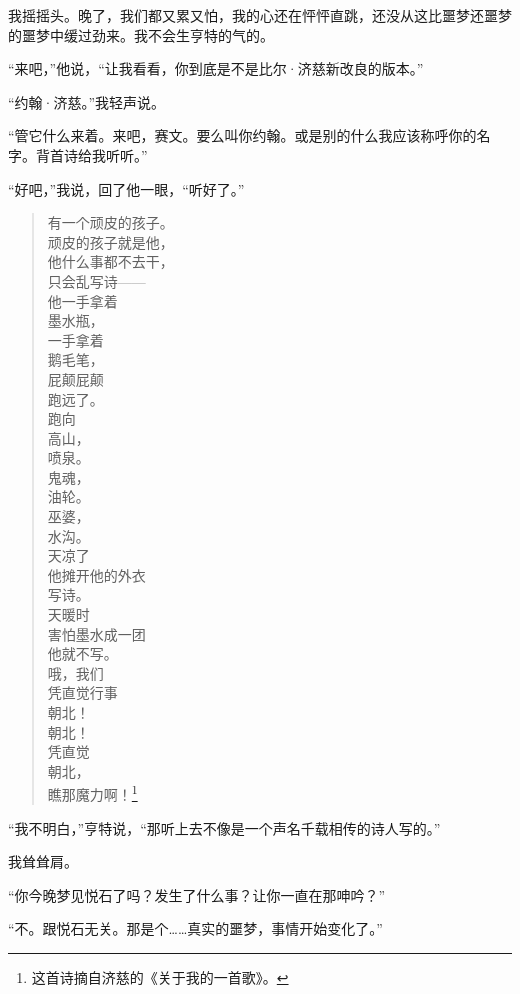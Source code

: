 \documentclass[AutoFakeBold=true]{book}
\begin{document}
我摇摇头。晚了，我们都又累又怕，我的心还在怦怦直跳，还没从这比噩梦还噩梦的噩梦中缓过劲来。我不会生亨特的气的。

``来吧，''他说，``让我看看，你到底是不是比尔·济慈新改良的版本。''

``约翰·济慈。''我轻声说。

``管它什么来着。来吧，赛文。要么叫你约翰。或是别的什么我应该称呼你的名字。背首诗给我听听。''

``好吧，''我说，回了他一眼，``听好了。''

\begin{quote}
	{\kaishu 有一个顽皮的孩子。\\
	顽皮的孩子就是他，\\
	他什么事都不去干，\\
	只会乱写诗——\\
	他一手拿着\\
	墨水瓶，\\
	一手拿着\\
	鹅毛笔，\\
	屁颠屁颠\\
	跑远了。\\
	跑向\\
	高山，\\
	喷泉。\\
	鬼魂，\\
	油轮。\\
	巫婆，\\
	水沟。\\
	天凉了\\
	他摊开他的外衣\\
	写诗。\\
	天暖时\\
	害怕墨水成一团\\
	他就不写。\\
	哦，我们\\
	凭直觉行事\\
	朝北！\\
	朝北！\\
	凭直觉\\
	朝北，\\
	瞧那魔力啊！}\footnote{这首诗摘自济慈的《关于我的一首歌》。}
\end{quote}

``我不明白，''亨特说，``那听上去不像是一个声名千载相传的诗人写的。''

我耸耸肩。

``你今晚梦见悦石了吗？发生了什么事？让你一直在那呻吟？''

``不。跟悦石无关。那是个……真实的噩梦，事情开始变化了。''
\end{document}
